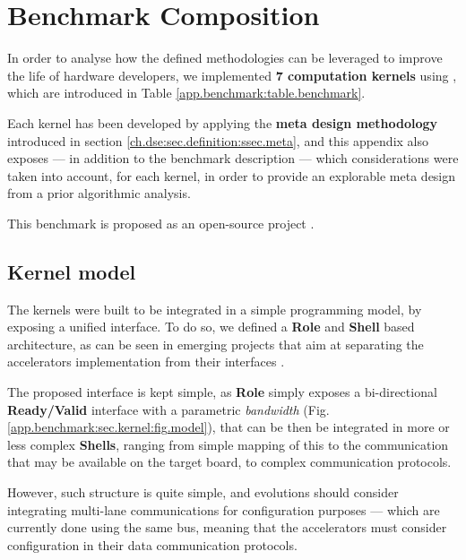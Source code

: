 \chapter{Benchmark Composition}

    In order to analyse how the defined methodologies can be leveraged to improve the life of hardware developers, we implemented {\bf 7 computation kernels} using \chisel, which are introduced in Table \ref{app.benchmark:table.benchmark}.

    Each kernel has been developed by applying the {\bf meta design methodology} introduced in section \ref{ch.dse:sec.definition:ssec.meta}, and this appendix also exposes --- in addition to the benchmark description --- which considerations were taken into account, for each kernel, in order to provide an explorable meta design from a prior algorithmic analysis. 

    This benchmark is proposed as an open-source project \cite{ferres_benchmark_2021}.

    \section*{Kernel model}
        The kernels were built to be integrated in a simple programming model, by exposing a unified interface.
        To do so, we defined a \chisel{} {\bf Role} and {\bf Shell} based architecture, as can be seen in emerging  projects that aim at separating the accelerators implementation from their interfaces \cite{caulfield_cloud-scale_2016}.

        The proposed interface is kept simple, as {\bf Role} simply exposes a bi-directional {\bf Ready/Valid} interface with a parametric {\it bandwidth} (Fig. \ref{app.benchmark:sec.kernel:fig.model}), that can be then be integrated in more or less complex {\bf Shells}, ranging from simple mapping of this  to the communication  that may be available on the target board, to complex communication protocols.

        However, such structure is quite simple, and evolutions should consider integrating multi-lane communications for configuration purposes --- which are currently done using the same  bus, meaning that the accelerators must consider configuration in their data communication protocols.

